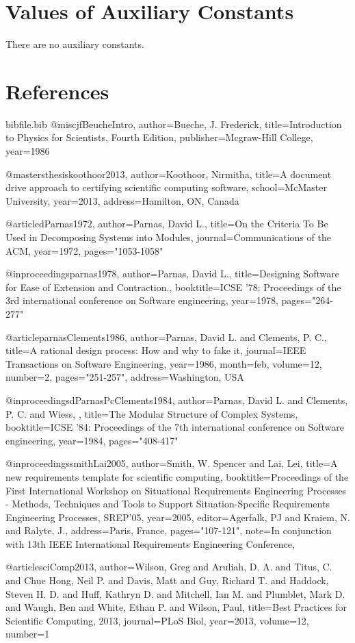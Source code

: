\documentclass[12pt]{article}
\begin{document}
\section{Values of Auxiliary Constants}
\label{Sec:AuxConstants}
There are no auxiliary constants.
\section{References}
\label{Sec:References}
\begin{filecontents*}{bibfile.bib}
@misc{jfBeucheIntro,
author={Bueche, J. Frederick},
title={Introduction to Physics for Scientists, Fourth Edition},
publisher={Mcgraw-Hill College},
year={1986}}

@mastersthesis{koothoor2013,
author={Koothoor, Nirmitha},
title={A document drive approach to certifying scientific computing software},
school={McMaster University},
year={2013},
address={Hamilton, ON, Canada}}

@article{dParnas1972,
author={Parnas, David L.},
title={On the Criteria To Be Used in Decomposing Systems into Modules},
journal={Communications of the ACM},
year={1972},
pages={"1053-1058"}}

@inproceedings{parnas1978,
author={Parnas, David L.},
title={Designing Software for Ease of Extension and Contraction.},
booktitle={ICSE '78: Proceedings of the 3rd international conference on Software engineering},
year={1978},
pages={"264-277"}}

@article{parnasClements1986,
author={Parnas, David L. and Clements, P. C.},
title={A rational design process: How and why to fake it},
journal={IEEE Transactions on Software Engineering},
year={1986},
month={feb},
volume={12},
number={2},
pages={"251-257"},
address={Washington, USA}}

@inproceedings{dParnasPcClements1984,
author={Parnas, David L. and Clements, P. C. and Wiess, },
title={The Modular Structure of Complex Systems},
booktitle={ICSE '84: Proceedings of the 7th international conference on Software engineering},
year={1984},
pages={"408-417"}}

@inproceedings{smithLai2005,
author={Smith, W. Spencer and Lai, Lei},
title={A new requirements template for scientific computing},
booktitle={Proceedings of the First International Workshop on Situational Requirements Engineering Processes - Methods, Techniques and Tools to Support Situation-Specific Requirements Engineering Processes, SREP'05},
year={2005},
editor={Agerfalk, PJ and Kraiem, N. and Ralyte, J.},
address={Paris, France},
pages={"107-121"},
note={In conjunction with 13th IEEE International Requirements Engineering Conference,}}

@article{sciComp2013,
author={Wilson, Greg and Aruliah, D. A. and Titus, C. and Chue Hong, Neil P. and Davis, Matt and Guy, Richard T. and Haddock, Steven H. D. and Huff, Kathryn D. and Mitchell, Ian M. and Plumblet, Mark D. and Waugh, Ben and White, Ethan P. and Wilson, Paul},
title={Best Practices for Scientific Computing, 2013},
journal={PLoS Biol},
year={2013},
volume={12},
number={1}}
\end{filecontents*}
\nocite{*}
\printbibliography[heading=none]
\end{document}

